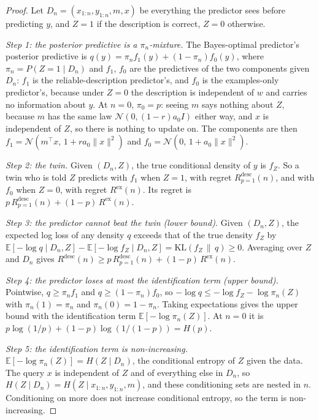 \documentclass[10pt]{article}
\newcommand{\E}{\mathbb{E}}
\begin{document}
\begin{proof}
Let $D_n = (x_{1:n}, y_{1:n}, m, x)$ be everything the predictor sees before predicting $y$, and $Z = 1$ if the description is correct, $Z = 0$ otherwise.

\emph{Step 1: the posterior predictive is a $\pi_n$-mixture.} The Bayes-optimal predictor's posterior predictive is $q(y) = \pi_n f_1(y) + (1 - \pi_n) f_0(y)$, where $\pi_n = P(Z = 1 \mid D_n)$ and $f_1$, $f_0$ are the predictives of the two components given $D_n$: $f_1$ is the reliable-description predictor's, and $f_0$ is the examples-only predictor's, because under $Z = 0$ the description is independent of $w$ and carries no information about $y$. At $n = 0$, $\pi_0 = p$: seeing $m$ says nothing about $Z$, because $m$ has the same law $\mathcal{N}(0, (1-r) a_0 I)$ either way, and $x$ is independent of $Z$, so there is nothing to update on. The components are then $f_1 = \mathcal{N}(m^\top x,\, 1 + r a_0\|x\|^2)$ and $f_0 = \mathcal{N}(0,\, 1 + a_0\|x\|^2)$.

\emph{Step 2: the twin.} Given $(D_n, Z)$, the true conditional density of $y$ is $f_Z$. So a twin who is told $Z$ predicts with $f_1$ when $Z = 1$, with regret $R^{\mathrm{desc}}_{p=1}(n)$, and with $f_0$ when $Z = 0$, with regret $R^{\mathrm{ex}}(n)$. Its regret is $p\,R^{\mathrm{desc}}_{p=1}(n) + (1-p)\,R^{\mathrm{ex}}(n)$.

\emph{Step 3: the predictor cannot beat the twin (lower bound).} Given $(D_n, Z)$, the expected log loss of any density $q$ exceeds that of the true density $f_Z$ by $\E[-\log q \mid D_n, Z] - \E[-\log f_Z \mid D_n, Z] = \mathrm{KL}(f_Z \,\|\, q) \ge 0$. Averaging over $Z$ and $D_n$ gives $R^{\mathrm{desc}}(n) \ge p\,R^{\mathrm{desc}}_{p=1}(n) + (1-p)\,R^{\mathrm{ex}}(n)$.

\emph{Step 4: the predictor loses at most the identification term (upper bound).} Pointwise, $q \ge \pi_n f_1$ and $q \ge (1 - \pi_n) f_0$, so $-\log q \le -\log f_Z - \log \pi_n(Z)$ with $\pi_n(1) = \pi_n$ and $\pi_n(0) = 1 - \pi_n$. Taking expectations gives the upper bound with the identification term $\E[-\log \pi_n(Z)]$. At $n = 0$ it is $p \log(1/p) + (1-p)\log(1/(1-p)) = H(p)$.

\emph{Step 5: the identification term is non-increasing.} $\E[-\log \pi_n(Z)] = H(Z \mid D_n)$, the conditional entropy of $Z$ given the data. The query $x$ is independent of $Z$ and of everything else in $D_n$, so $H(Z \mid D_n) = H(Z \mid x_{1:n}, y_{1:n}, m)$, and these conditioning sets are nested in $n$. Conditioning on more does not increase conditional entropy, so the term is non-increasing.


\end{proof}
\end{document}
